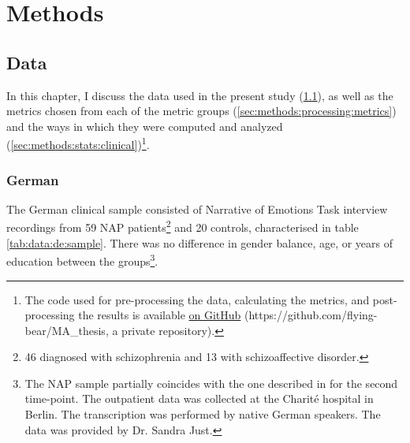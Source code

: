 
\chapter{Methods} %

\label{chap:3:methods} 

\section{Data}
\label{sec:methods:data:clinical}

In this chapter, I discuss the data used in the present study (\ref{sec:methods:data:clinical}), as well as the metrics chosen from each of the metric groups (\ref{sec:methods:processing:metrics}) and the ways in which they were computed and analyzed (\ref{sec:methods:stats:clinical})\footnote{The code used for pre-processing the data, calculating the metrics, and post-processing the results is available \href{https://github.com/flying-bear/MA_thesis}{on GitHub} (https://github.com/flying-bear/MA\_thesis, a private repository).}.

\subsection{German}
\label{sec:methods:data:clinical:german}

The German clinical sample consisted of Narrative of Emotions Task \citep{buck2014net} interview recordings from 59 NAP patients\footnote{46 diagnosed with schizophrenia and 13 with schizoaffective disorder.} and 20 controls, characterised in table \ref{tab:data:de:sample}. There was no difference in gender balance, age, or years of education between the groups\footnote{The NAP sample partially coincides with the one described in \citet{just2023validation} for the second time-point. The outpatient data was collected at the Charité hospital in Berlin. The transcription was performed by native German speakers. The data was provided by Dr. Sandra Just.}.

